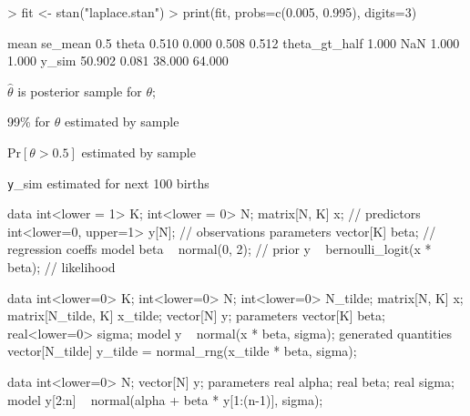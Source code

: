 \documentclass[10pt]{report}
\begin{document}
%
\begin{codein}
> fit <- stan("laplace.stan")
> print(fit, probs=c(0.005, 0.995), digits=3)
\end{codein}
\begin{codeout}
                     mean se_mean   0.5%
theta               0.510   0.000  0.508   0.512
theta_gt_half       1.000     NaN  1.000   1.000
y_sim              50.902   0.081 38.000  64.000
\end{codeout}
%
\begin{subitemize}
\item {} $\hat{\theta}$ is posterior sample  for $\theta$;
\item 99\%  for $\theta$ estimated by sample 
\item $\textrm{Pr}[\theta > 0.5]$ estimated by sample 
\item {\texttt y\_sim} estimated  for next 100 births
\end{subitemize}


%
\begin{stancode}
 data {
   int<lower = 1> K;
   int<lower = 0> N;
   matrix[N, K] x;                  // predictors
   int<lower=0, upper=1> y[N];      // observations
 }
 parameters {
   vector[K] beta;                  // regression coeffs
 }
 model {
   beta ~ normal(0, 2);            // prior
   y ~ bernoulli_logit(x * beta);  // likelihood
 }
\end{stancode}

%
\begin{stancode}
data {
  int<lower=0> K;
  int<lower=0> N;           int<lower=0> N_tilde;
  matrix[N, K] x;           matrix[N_tilde, K] x_tilde;
  vector[N] y;
}
parameters {
  vector[K] beta;           real<lower=0> sigma;
}
model {
  y ~ normal(x * beta, sigma);
}
generated quantities {
  vector[N_tilde] y_tilde
    = normal_rng(x_tilde * beta, sigma);
}
\end{stancode}

%
\begin{stancode}
  data {
    int<lower=0> N;   vector[N] y;
  }
  parameters {
    real alpha;  real beta;  real sigma;
  }
  model {
    y[2:n] ~ normal(alpha + beta * y[1:(n-1)], sigma);
  }
\end{stancode}
\end{document}

